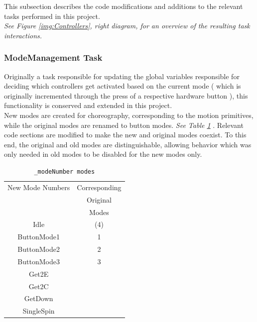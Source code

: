 This subsection describes the code modifications and additions to the relevant tasks performed in this project.\\

\textit{See Figure \ref{img:Controllers}, right diagram, for an overview of the resulting task interactions.}

\subsubsection{ModeManagement Task}

Originally a task responsible for updating the global variables responsible for deciding which controllers get activated based on the current mode ( which is originally incremented through the press of a respective hardware button ), this functionality is conserved and extended in this project.\\

New modes are created for choreography, corresponding to the motion primitives, while the original modes are renamed to button modes. \textit{See Table \ref{tab:modenumbers} }. Relevant code sections are modified to make the new and original modes coexist. To this end, the original and old modes are distinguishable, allowing behavior which was only needed in old modes to be disabled for the new modes only.\\

\begin{table}[H]
\begin{center}
\caption{\texttt{\_modeNumber modes}}\vspace{1ex}
\label{tab:modenumbers}
\begin{tabular}{cc}\hline
New Mode Numbers & Corresponding \\ 
                 & Original      \\
                 & Modes         \\ \hline 
Idle        & (4) \\
ButtonMode1 & 1 \\
ButtonMode2 & 2 \\
ButtonMode3 & 3 \\
Get2E       & \\
Get2C       & \\
GetDown     & \\
SingleSpin  & \\
 \hline
\end{tabular}
\end{center}
\end{table}

